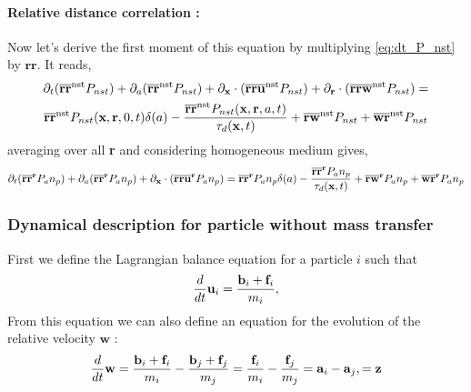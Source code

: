 \paragraph{Relative distance correlation :}
Now let's derive the first moment of this equation by multiplying \ref{eq:dt_P_nst} by $\textbf{rr}$. 
It reads, 
\begin{multline}
    \partial_t (\overline{\textbf{rr}}^\text{nst} P_{nst})
    + \partial_a (\overline{\textbf{rr}}^\text{nst} P_{nst})
    + \partial_{\textbf{x}} \cdot (\overline{\textbf{rr}\textbf{u} }^\text{nst} P_{nst})
    + \partial_{\textbf{r}}  \cdot (\overline{\textbf{rr}\textbf{w}}^\text{nst} P_{nst})
    =  \\
    \overline{\textbf{rr}}^\text{nst} P_{nst}(\textbf{x},\textbf{r},0,t)\delta(a)
    -  \frac{\overline{\textbf{rr}}^\text{nst} P_{nst}(\textbf{x},\textbf{r},a,t)}{\tau_d(\textbf{x},t)}
    + \overline{\textbf{rw}}^\text{nst}P_{nst}
    + \overline{\textbf{wr}}^\text{nst}P_{nst}
\end{multline}
averaging over all \textbf{r} and considering homogeneous medium gives,
\begin{multline}
    \partial_t (\overline{\textbf{rr}}^{\textbf{r}} P_{a}n_p)
    + \partial_a (\overline{\textbf{rr}}^{\textbf{r}} P_{a}n_p)
    + \partial_{\textbf{x}} \cdot (\overline{\textbf{rr}\textbf{u} }^{\textbf{r}} P_{a}n_p)
    =  
    \overline{\textbf{rr}}^{\textbf{r}} P_{a}n_p\delta(a)
    -  \frac{\overline{\textbf{rr}}^{\textbf{r}} P_{a}n_p}{\tau_d(\textbf{x},t)}
    + \overline{\textbf{rw}}^{\textbf{r}} P_{a}n_p
    + \overline{\textbf{wr}}^{\textbf{r}} P_{a}n_p
\end{multline}




\subsubsection{Dynamical description for particle without mass transfer}
First we define the Lagrangian balance equation for a particle $i$ such that 
\begin{equation}
    \frac{d}{d t} \textbf{u}_i
     = \frac{
        \textbf{b}_i
        + \textbf{f}_i
     }{m_i},
     \label{eq:dt_u_i}
 \end{equation}
From this equation we can also define an equation for the evolution of the relative velocity $\textbf{w}$ :
\begin{equation}
    \frac{d}{d t} \textbf{w}
    = \frac{
        \textbf{b}_i
        + \textbf{f}_i
    }{m_i}
    -\frac{
        \textbf{b}_j
        + \textbf{f}_j
    }{m_j}
    =\frac{
        \textbf{f}_i
    }{m_i}
    -\frac{
        \textbf{f}_j
    }{m_j}
    = 
    \textbf{a}_i
    - \textbf{a}_j,
    = \textbf{z}
    \label{eq:dt_w}
\end{equation}
